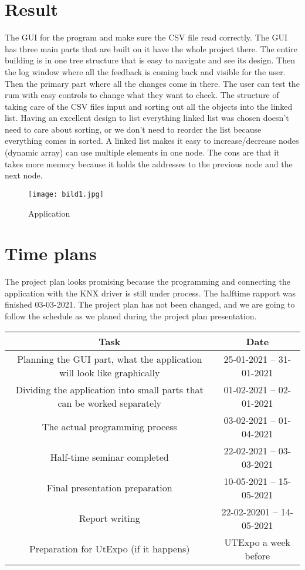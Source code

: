 \documentclass{article}
\begin{document}
\section{Result}
The GUI for the program and make sure the CSV file read correctly. The GUI has three main parts that are built on it have the whole project there. The entire building is in one tree structure that is easy to navigate and see its design. Then the log window where all the feedback is coming back and visible for the user. Then the primary part where all the changes come in there. The user can test the rum with easy controls to change what they want to check. The structure of taking care of the CSV files input and sorting out all the objects into the linked list. Having an excellent design to list everything linked list was chosen doesn't need to care about sorting, or we don't need to reorder the list because everything comes in sorted. A linked list makes it easy to increase/decrease nodes (dynamic array) can use multiple elements in one node. The cons are that it takes more memory because it holds the addresses to the previous node and the next node.
\begin{figure}[h!]
    \centering
    \texttt{[image: bild1.jpg]}
    \caption{Application}
    \label{fig:my_label}
\end{figure}
\newpage
\section{Time plans}
The project plan looks promising because the programming and connecting the application with the KNX driver is still under process. The halftime rapport was finished 03-03-2021. The project plan has not been changed, and we are going to follow the schedule as we planed during the project plan presentation. \\

\begin{table}[h!]

    \begin{tabular}{|c|c|}
        \hline
        \textbf {Task} & \textbf{Date}  \\
        \hline
        Planning the GUI part, what the application will look like graphically & 25-01-2021 -- 31-01-2021 \\
        \hline
        Dividing the application into small parts that can be worked separately & 01-02-2021 -- 02-01-2021\\
        \hline
        The actual programming process & 03-02-2021 -- 01-04-2021\\
        \hline
        Half-time seminar completed & 22-02-2021 -- 03-03-2021\\
        \hline
        Final presentation preparation & 10-05-2021 -- 15-05-2021 \\
        \hline
        Report writing & 22-02-20201 -- 14-05-2021\\
        \hline
        Preparation for UtExpo (if it happens) & UTExpo a week before \\
        \hline
    \end{tabular}
\end{table}
\newpage



\end{document}
